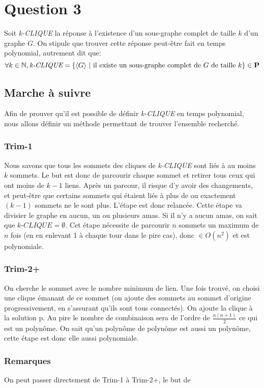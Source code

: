 \documentclass{article}
\newcommand\PP{{\normalfont{\textbf{P}}}}
\newcommand\bk[1]{\langle #1 \rangle}
\newcommand\cli[1]{\textit{#1-CLIQUE}}
\begin{document}
\pagebreak

\section{Question 3}
Soit \cli{k} la réponse à l'existence d'un sous-graphe complet de taille $k$ d'un graphe $G$. On stipule que trouver cette réponse peut-être fait en temps polynomial, autrement dit que:
$$\forall k \in \mathbb{N}, \cli{k}=\{\bk{G}\text{ | il existe un sous-graphe complet de $G$ de taille $k$}\}\in \PP$$

\subsection{Marche à suivre}
Afin de prouver qu'il est possible de définir \cli{k} en temps polynomial, nous allons définir un méthode permettant de trouver l'ensemble recherché.
\subsubsection{Trim-1}
Nous savons que tous les sommets des cliques de \cli{k} sont liés à au moins $k$ sommets. Le but est donc de parcourir chaque sommet et retirer tous ceux qui ont moins de $k - 1$ liens. Après un parcour, il risque d'y avoir des changements, et peut-être que certains sommets qui étaient liés à plus de ou exactement $(k - 1)$ sommets ne le sont plus. L'étape est donc relancée. Cette étape va divisier le graphe en aucun, un ou plusieurs amas. Si il n'y a aucun amas, on sait que $\cli{k}=\emptyset$. Cet étape nécessite de parcourir $n$ sommets un maximum de $n$ fois (en en enlevant 1 à chaque tour dans le pire cas), donc $\in O(n^2)$ et est polynomiale.
\subsubsection{Trim-2+}
On cherche le sommet avec le nombre minimum de lien. Une fois trouvé, on choisi une clique émanant de ce sommet (on ajoute des sommets au sommet d'origine progressivement, en s'assurant qu'ils sont tous connectés). On ajoute la clique à la solution p. Au pire le nombre de combinaison sera de l'ordre de $\frac{n(n+1)}{2}$ ce qui est un polynôme. On sait qu'un polynôme de polynôme est aussi un polynôme, cette étape est donc elle aussi polynomiale.
\subsubsection{Remarques}
On peut passer directement de Trim-1 à Trim-2+, le but de
\end{document}
